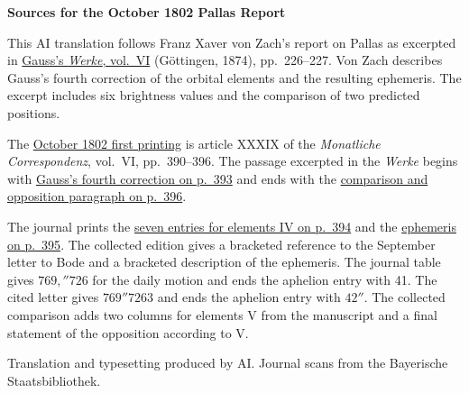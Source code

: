 \clearpage\thispagestyle{empty}
\begin{center}\textbf{Sources for the October 1802 Pallas Report}\end{center}
\noindent This AI translation follows Franz Xaver von Zach’s report on Pallas as excerpted in \href{https://gdz.sub.uni-goettingen.de/id/PPN236007467}{Gauss’s \textit{Werke}, vol.~VI} (Göttingen, 1874), pp.~226--227. Von Zach describes Gauss’s fourth correction of the orbital elements and the resulting ephemeris. The excerpt includes six brightness values and the comparison of two predicted positions.
\par\smallskip\noindent The \href{https://api.digitale-sammlungen.de/iiif/image/v2/bsb10538598_00400/full/1450,/0/default.jpg}{October 1802 first printing} is article XXXIX of the \textit{Monatliche Correspondenz}, vol.~VI, pp.~390--396. The passage excerpted in the \textit{Werke} begins with \href{https://api.digitale-sammlungen.de/iiif/image/v2/bsb10538598_00403/full/1450,/0/default.jpg}{Gauss’s fourth correction on p.~393} and ends with the \href{https://api.digitale-sammlungen.de/iiif/image/v2/bsb10538598_00406/full/1450,/0/default.jpg}{comparison and opposition paragraph on p.~396}.
\par\smallskip\noindent The journal prints the \href{https://api.digitale-sammlungen.de/iiif/image/v2/bsb10538598_00404/full/1450,/0/default.jpg}{seven entries for elements IV on p.~394} and the \href{https://api.digitale-sammlungen.de/iiif/image/v2/bsb10538598_00405/full/1450,/0/default.jpg}{ephemeris on p.~395}. The collected edition gives a bracketed reference to the September letter to Bode and a bracketed description of the ephemeris. The journal table gives \(769{,}''726\) for the daily motion and ends the aphelion entry with 41. The cited letter gives \(769''7263\) and ends the aphelion entry with \(42''\). The collected comparison adds two columns for elements V from the manuscript and a final statement of the opposition according to V.
\par\smallskip\noindent Translation and typesetting produced by AI. Journal scans from the Bayerische Staatsbibliothek.
\clearpage
